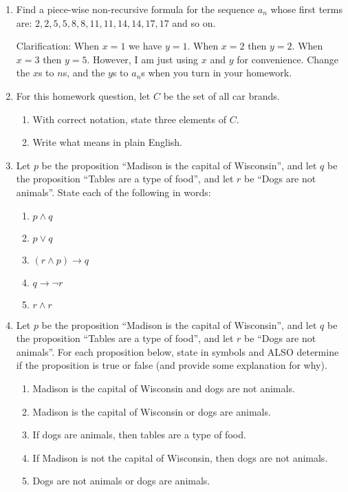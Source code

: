 \documentclass{article}
\begin{document}
\begin{enumerate}

\item 
Find a piece-wise non-recursive formula for the sequence $a_n$ whose first terms are: $2,2,5,5,8,8,11,11,14,14,17,17$ and so on.

Clarification: When $x=1$ we have $y=1$. When $x=2$ then $y=2$. When $x=3$ then $y=5$. However, I am just using $x$ and $y$ for convenience. Change the $x$s to $n$s, and the $y$s to $a_n$s when you turn in your homework.

\item 
For this homework question, let $C$ be the set of all car brands.
\begin{enumerate}
\item With correct notation, state three elements of $C$.
\item Write what  means in plain English.
\end{enumerate}

\item 
Let $p$ be the proposition ``Madison is the capital of Wisconsin'', and let $q$ be the proposition ``Tables are a type of food'', and let $r$ be ``Dogs are not animals''. State each of the following in words:
\begin{enumerate}
\item $p \wedge q$
\item $p \vee q$
\item $(r \wedge p) \rightarrow q$
\item $q \rightarrow \neg r$
\item $r \wedge r$
\end{enumerate}

\item 
Let $p$ be the proposition ``Madison is the capital of Wisconsin'', and let $q$ be the proposition ``Tables are a type of food'', and let $r$ be ``Dogs are not animals''. For each proposition below, state in symbols and ALSO determine if the proposition is true or false (and provide some explanation for why).
\begin{enumerate}
\item Madison is the capital of Wisconsin and dogs are not animals.
\item Madison is the capital of Wisconsin or dogs are animals.
\item If dogs are animals, then tables are a type of food.
\item If Madison is not the capital of Wisconsin, then dogs are not animals.
\item Dogs are not animals or dogs are animals.
\end{enumerate}


\end{enumerate}
\end{document}
